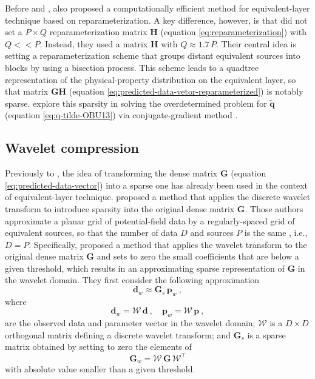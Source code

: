 Before \cite{oliveirajr-etal2013} and \cite{mendonca-2020}, \cite{barnes-lumley_2011} also proposed a computationally
efficient method for equivalent-layer technique based on reparameterization. 
A key difference, however, is that \cite{barnes-lumley_2011} did not set a $P \times Q$ reparameterization matrix $\mathbf{H}$
(equation \ref{eq:reparameterization}) with $Q << P$. 
Instead, they used a matrix $\mathbf{H}$ with $Q \approx 1.7 \, P$. 
Their central idea is setting a reparameterization scheme that groups distant equivalent sources into blocks by
using a bisection process. 
This scheme leads to a quadtree representation of the physical-property distribution on the equivalent layer, 
so that matrix $\mathbf{G}\mathbf{H}$ (equation \ref{eq:predicted-data-vetor-reparameterized}) is notably sparse.
\cite{barnes-lumley_2011} explore this sparsity in solving the overdetermined problem for $\tilde{\mathbf{q}}$
(equation \ref{eq:q-tilde-OBU13}) via conjugate-gradient method \cite[e.g.,][sec. 11.3]{golub-vanloan2013}.

\subsection{Wavelet compression}

Previously to \cite{barnes-lumley_2011}, the idea of transforming the dense matrix $\mathbf{G}$ (equation \ref{eq:predicted-data-vector}) 
into a sparse one has already been used in the context of equivalent-layer technique.
\cite{li-oldenburg_2010} proposed a method that applies the discrete wavelet transform to introduce sparsity into 
the original dense matrix $\mathbf{G}$.
Those authors approximate a planar grid of potential-field data by a regularly-spaced grid of equivalent sources,
so that the number of data $D$ and sources $P$ is the same , i.e., $D = P$.
Specifically, \cite{li-oldenburg_2010} proposed a method that applies the wavelet transform to the original dense 
matrix $\mathbf{G}$ and sets to zero the small coefficients that are below a given threshold, which results in an 
approximating sparse representation of $\mathbf{G}$ in the wavelet domain.
They first consider the following approximation
\begin{equation}
	\mathbf{d}_{w} \approx \mathbf{G}_{s} \, \mathbf{p}_{w} \: ,
	\label{eq:approximated-linear-system-wavelet-domain}
\end{equation}
where 
\begin{equation}
	\mathbf{d}_{w} = \boldsymbol{\mathcal{W}} \, \mathbf{d} \: , \quad 
	\mathbf{p}_{w} = \boldsymbol{\mathcal{W}} \, \mathbf{p} \: ,
	\label{eq:vectors-dw-pw}
\end{equation}
are the observed data and parameter vector in the wavelet domain; $\boldsymbol{\mathcal{W}}$ is a $D \times D$ orthogonal matrix defining a 
discrete wavelet transform; and $\mathbf{G}_{s}$ is a sparse matrix obtained by setting to zero the elements of
\begin{equation}
	\mathbf{G}_{w} = \boldsymbol{\mathcal{W}} \, \mathbf{G} \, \boldsymbol{\mathcal{W}}^{\top}
	\label{eq:matrix-Gw}
\end{equation}
with absolute value smaller than a given threshold.

